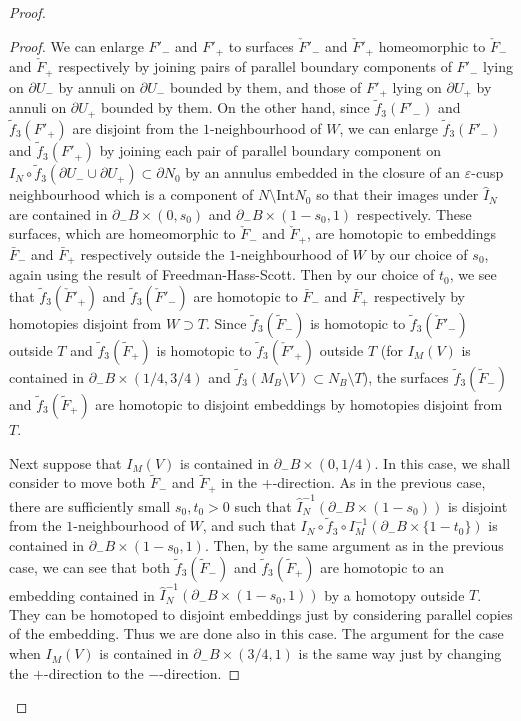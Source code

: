 \documentclass{amsart}
\theoremstyle{definition}
\numberwithin{figure}{section}
\numberwithin{equation}{section}
\def\Int{\mathrm{Int}}
\def\ve{\varepsilon}
\def\ve{\varepsilon}
\begin{document}
\begin{proof}
\begin{proof}
We can enlarge $F'_-$ and $F'_+$ to surfaces $\check F'_-$ and $\check F'_+$ homeomorphic to $\check F_-$ and $\check F_+$ respectively by joining pairs of parallel boundary components of $F'_-$ lying on $\partial U_-$ by annuli on $\partial U_-$ bounded by them, and those of $F'_+$ lying on $\partial U_+$  by annuli on  $\partial U_+$ bounded by them.
On the other hand, since $\tilde f_3(F'_-)$ and $\tilde f_3(F'_+)$ are disjoint from the $1$-neighbourhood of $W$, we can enlarge $\tilde f_3(F'_-)$ and $\tilde f_3(F'_+)$ by joining each pair of parallel boundary component on $I_N \circ \tilde f_3 (\partial U_- \cup \partial U_+) \subset \partial N_0$ by an annulus embedded in the closure of an $\ve$-cusp neighbourhood which is a component of $N \setminus \Int N_0$ so that their images under $\hat I_N$ are contained in $\partial_- B \times (0, s_0)$ and $\partial_- B \times (1-s_0, 1)$ respectively.
These surfaces, which are homeomorphic to $\check F_-$ and $\check F_+$, are homotopic to embeddings $\bar F_-$ and $\bar F_+$  respectively outside the $1$-neighbourhood of $W$ by our choice of $s_0$, again using the result of Freedman-Hass-Scott.
Then by our choice of $t_0$, we see that  $\tilde f_3 (\check F'_+)$ and $\tilde f_3 (\check F'_-)$ are homotopic to $\bar F_-$ and $\bar F_+$ respectively by homotopies disjoint from $W \supset T$.
Since $\tilde f_3(\tilde F_-)$ is homotopic to $\tilde f_3 (\check F'_-)$ outside $T$ and $\tilde f_3(\tilde F_+)$ is homotopic to $\tilde f_3 (\check F'_+)$ outside $T$ (for $I_M(V)$ is contained in $\partial_-B \times (1/4,3/4)$ and $\tilde f_3(M_B \setminus V) \subset N_B \setminus T$), the surfaces $\tilde f_3(\tilde F_-)$ and $\tilde f_3(\tilde F_+)$ are homotopic to disjoint embeddings by homotopies disjoint from $T$.

Next suppose that $I_M(V)$ is contained in $\partial_-B \times (0,1/4)$.
In this case, we shall consider to move both $\tilde F_-$ and $\tilde F_+ $ in the +-direction.
As in the previous case, there are sufficiently small  $s_0, t_0>0$ such that $\hat I_N^{-1}(\partial_-B \times (1-s_0))$ is disjoint from the $1$-neighbourhood of $W$, and such that $I_N \circ \tilde f_3\circ I_M^{-1}(\partial_- B \times \{1-t_0\})$ is contained in $\partial_- B \times (1-s_0, 1)$.
Then, by the same argument as in the previous case, we can see that both $\tilde f_3(\tilde F_-)$ and $\tilde f_3 (\tilde F_+)$ are homotopic to an embedding contained in $\hat I_N^{-1}(\partial_- B \times (1-s_0, 1))$ by a homotopy outside $T$.
They can be homotoped to disjoint embeddings just by considering parallel copies of the embedding.
Thus we are done also in this case.
The argument for the case when $I_M(V)$ is contained in $\partial_- B \times (3/4,1)$ is the same way just by changing the $+$-direction to the $-$-direction.
\end{proof}


\end{proof}
\end{document}
